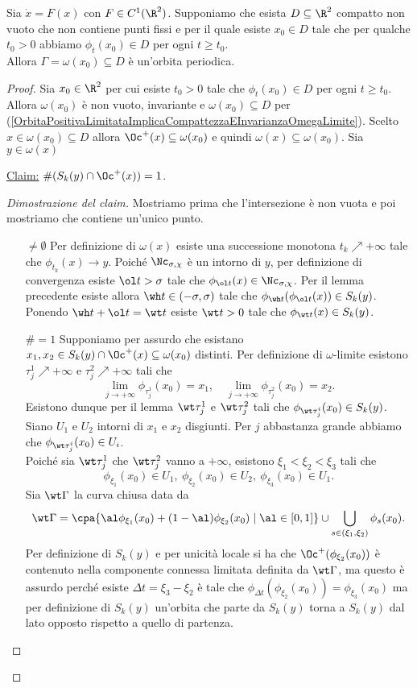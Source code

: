 \begin{theorem}\label{TeoremaPoincareBendixon}
Sia $\dot x=F(x)$ con $F\in C^1(\R^2)$. Supponiamo che esista $D\subseteq \R^2$ compatto non vuoto che non contiene punti fissi e per il quale esiste $x_0\in D$ tale che per qualche $t_0>0$ abbiamo $\phi_t(x_0)\in D$ per ogni $t\geq t_0$.\\
Allora $\Gamma=\omega(x_0)\subseteq D$ \`e un'orbita periodica.
\end{theorem}
\begin{proof}
Sia $x_0\in \R^2$ per cui esiste $t_0>0$ tale che $\phi_t(x_0)\in D$ per ogni $t\geq t_0$. Allora $\omega(x_0)$ \`e non vuoto, invariante e $\omega(x_0)\subseteq D$ per (\ref{OrbitaPositivaLimitataImplicaCompattezzaEInvarianzaOmegaLimite}). Scelto $x\in \omega(x_0)\subseteq D$ allora $\Oc^+(x)\subseteq \omega(x_0)$ e quindi $\omega(x)\subseteq \omega(x_0)$. Sia $y\in \omega(x)$
\vspace{0.25cm}

\noindent
\ul{Claim:} $\#(S_k(y)\cap \Oc^+(x))=1$.
\begin{proof}[Dimostrazione del claim]
Mostriamo prima che l'intersezione \`e non vuota e poi mostriamo che contiene un'unico punto.
\setlength{\leftmargini}{0cm}
\begin{itemize}
\item[$\boxed{\neq \emptyset}$] Per definizione di $\omega(x)$ esiste una successione monotona $t_k\nearrow +\infty$ tale che $\phi_{t_k}(x)\to y$. Poich\'e $\Nc_{\sigma,\chi}$ \`e un intorno di $y$, per definizione di convergenza esiste $\ol t>\sigma$ tale che $\phi_{\ol t}(x)\in \Nc_{\sigma,\chi}$. Per il lemma precedente esiste allora $\wh t\in (-\sigma,\sigma)$ tale che $\phi_{\wh t}(\phi_{\ol t}(x))\in S_k(y)$. Ponendo $\wh t+\ol t=\wt t$ esiste $\wt t>0$ tale che $\phi_{\wt t}(x)\in S_k(y)$.
\item[$\boxed{\#=1}$] Supponiamo per assurdo che esistano $x_1,x_2\in S_k(y)\cap \Oc^+(x)\subseteq \omega(x_0)$ distinti. Per definizione di $\omega$-limite esistono $\tau_{j}^1\nearrow+\infty$ e $\tau_{j}^2\nearrow+\infty$ tali che 
\[\lim_{j\to+\infty}\phi_{\tau^1_j}(x_0)=x_1,\quad \lim_{j\to+\infty}\phi_{\tau^2_j}(x_0)=x_2.\]
Esistono dunque per il lemma $\wt \tau^1_j$ e $\wt \tau^2_j$ tali che $\phi_{\wt \tau^i_j}(x_0)\in S_k(y)$. Siano $U_1$ e $U_2$ intorni di $x_1$ e $x_2$ disgiunti. Per $j$ abbastanza grande abbiamo che $\phi_{\wt \tau^i_j}(x_0)\in U_i$.\\
Poich\'e sia $\wt \tau_j^1$ che $\wt \tau_j^2$ vanno a $+\infty$, esistono $\xi_1<\xi_2<\xi_3$ tali che
\[\phi_{\xi_1}(x_0)\in U_1,\ \phi_{\xi_2}(x_0)\in U_2,\ \phi_{\xi_3}(x_0)\in U_1.\]
Sia $\wt \Gamma$ la curva chiusa data da
\[\wt \Gamma=\cpa{\al\phi_{\xi_1}(x_0)+(1-\al)\phi_{\xi_2}(x_0)\mid \al\in [0,1]}\cup \bigcup_{s\in (\xi_1,\xi_2)}\phi_s(x_0).\]
Per definizione di $S_k(y)$ e per unicit\`a locale si ha che $\Oc^+(\phi_{\xi_2}(x_0))$ \`e contenuto nella componente connessa limitata definita da $\wt \Gamma$, ma questo \`e assurdo perch\'e esiste $\Delta t=\xi_3-\xi_2$ \`e tale che $\phi_{\Delta t}(\phi_{\xi_2}(x_0))=\phi_{\xi_3}(x_0)$ ma per definizione di $S_k(y)$ un'orbita che parte da $S_k(y)$ torna a $S_k(y)$ dal lato opposto rispetto a quello di partenza.


\end{itemize}
\end{proof}
\end{proof}
